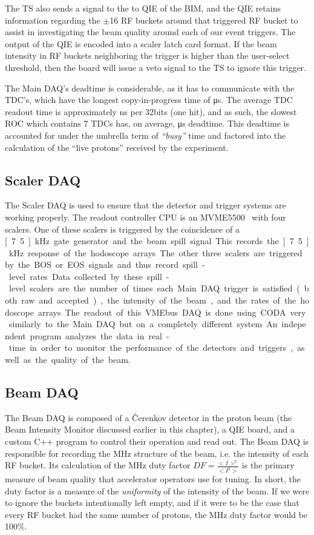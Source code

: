 The TS also sends a signal to the to QIE of the BIM, and the QIE retains information regarding the $\pm$16 RF buckets around that triggered RF bucket to assist in investigating the beam quality around each of our event triggers. The output of the QIE is encoded into a scaler latch card format. If the beam intensity in RF buckets neighboring the trigger is higher than the user-select threshold, then the board will issue a veto signal to the TS to ignore this trigger.

The Main DAQ's deadtime is considerable, as it has to communicate with the TDC's, which have the longest copy-in-progress time of \unit[32]{\us}. The average TDC readout time is approximately \unit[300]{ns} per 32bits (one hit), and as such, the slowest ROC which contains 7 TDCs has, on average, \unit[150]{\us} deadtime. This deadtime is accounted for under the umbrella term of \emph{``busy''} time and factored into the calculation of the ``live protons'' received by the experiment.

\subsection{Scaler DAQ}

The Scaler DAQ is used to ensure that the detector and trigger systems are working properly. The readout controller CPU is an MVME5500~\cite{mvme:scaler} with four scalers. One of these scalers is triggered by the coincidence of a \unit[7.5]{kHz} gate generator and the beam spill signal. This records the \unit[7.5]{kHz} response of the hodoscope arrays. The other three scalers are triggered by the BOS or EOS signals and thus record spill-level rates. Data collected by these spill-level scalers are the number of times each Main DAQ trigger is satisfied (both raw and accepted), the intensity of the beam, and the rates of the hodoscope arrays. The readout of this VMEbus DAQ is done using CODA very similarly to the Main DAQ but on a completely different system. An independent program analyzes the data in real-time in order to monitor the performance of the detectors and triggers, as well as the quality of the beam. 


\subsection{Beam DAQ}

The Beam DAQ is composed of a \v{C}erenkov detector in the proton beam (the Beam Intensity Monitor discussed earlier in this chapter), a QIE board, and a custom C++ program to control their operation and read out. The Beam DAQ is responsible for recording the \unit[53]{MHz} structure of the beam, i.e. the intensity of each RF bucket. Its calculation of the \unit[53]{MHz} duty factor $DF=\frac{<I>^{2}}{<I^{2}>}$ is the primary measure of beam quality that accelerator operators use for tuning. In short, the duty factor is a measure of the \emph{uniformity} of the intensity of the beam. If we were to ignore the buckets intentionally left empty, and if it were to be the case that every RF bucket had the same number of protons, the \unit[53]{MHz} duty factor would be 100\%.


